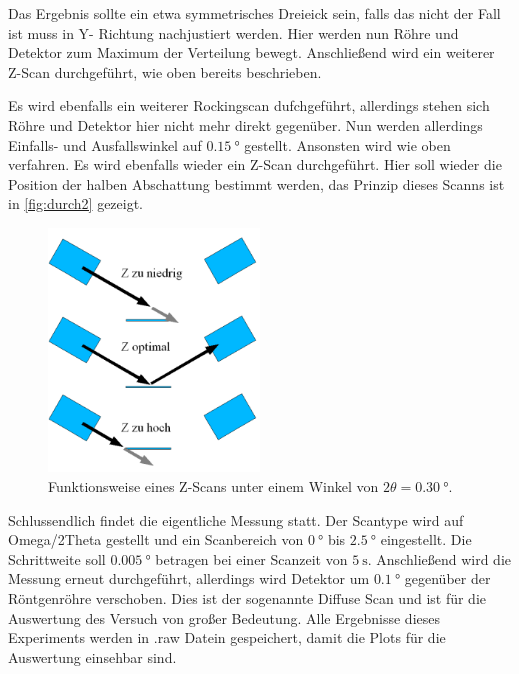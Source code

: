 Das Ergebnis sollte ein etwa symmetrisches Dreieick sein, falls das nicht der Fall ist muss in Y- Richtung nachjustiert werden.
Hier werden nun Röhre und Detektor zum Maximum der Verteilung bewegt.
Anschließend wird ein weiterer Z-Scan durchgeführt, wie oben bereits beschrieben.

Es wird ebenfalls ein weiterer Rockingscan dufchgeführt, allerdings stehen sich Röhre und Detektor hier nicht mehr direkt gegenüber. 
Nun werden allerdings Einfalls- und Ausfallswinkel auf $\SI{0.15}{\degree}$ gestellt.
Ansonsten wird wie oben verfahren. 
Es wird ebenfalls wieder ein Z-Scan durchgeführt.
Hier soll wieder die Position der halben Abschattung bestimmt werden, das Prinzip dieses Scanns ist in \autoref{fig:durch2} gezeigt.

\begin{figure}
    \centering
    \includegraphics[width=0.5\textwidth]{images/z.png}
    \caption{Funktionsweise eines Z-Scans unter einem Winkel von $2 \theta = \SI{0.30}{\degree}$. \cite{V44}}
    \label{fig:durch2}
\end{figure}

Schlussendlich findet die eigentliche Messung statt.
Der Scantype wird auf Omega/2Theta gestellt und ein Scanbereich von $\SI{0}{\degree}$ bis $\SI{2.5}{\degree}$ eingestellt.
Die Schrittweite soll $\SI{0.005}{\degree}$ betragen bei einer Scanzeit von $\SI{5}{\second}$.
Anschließend wird die Messung erneut durchgeführt, allerdings wird Detektor um $\SI{0.1}{\degree}$ gegenüber der Röntgenröhre verschoben.
Dies ist der sogenannte Diffuse Scan und ist für die Auswertung des Versuch von großer Bedeutung.
Alle Ergebnisse dieses Experiments werden in .raw Datein gespeichert, damit die Plots für die Auswertung einsehbar sind.
